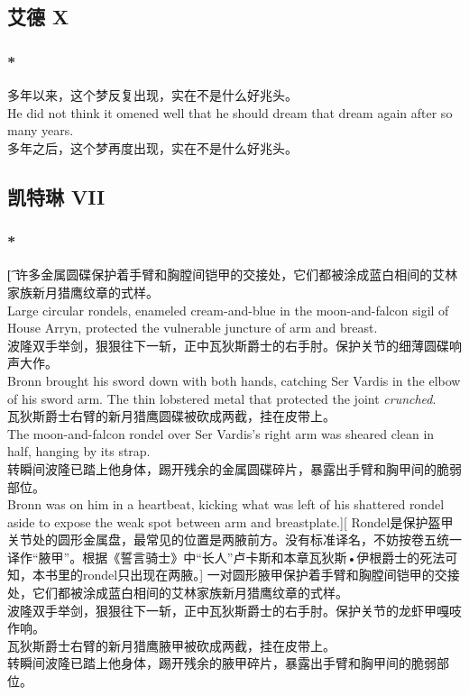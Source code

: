 \documentclass[12pt,a4paper]{article}
\newcommand{\la}[1]{{\color{blue}#1}\\}
\begin{document}
\subsection{艾德 X}
\subsubsection{\color{red}*}\la{
	多年以来，这个梦反复出现，实在不是什么好兆头。\\
	He did not think it omened well that he should dream that dream again after so many years.}
	多年之后，这个梦再度出现，实在不是什么好兆头。
	
\subsection{凯特琳 VII}

\subsubsection{\color{red}*}\label{1.40.1}\t[
	许多金属圆碟保护着手臂和胸膛间铠甲的交接处，它们都被涂成蓝白相间的艾林家族新月猎鹰纹章的式样。\\
	Large circular rondels, enameled cream-and-blue in the moon-and-falcon sigil of House Arryn, protected the vulnerable juncture of arm and breast.\\
	波隆双手举剑，狠狠往下一斩，正中瓦狄斯爵士的右手肘。保护关节的细薄圆碟响声大作。\\
	Bronn brought his sword down with both hands, catching Ser Vardis in the elbow of his sword arm. The thin lobstered metal that protected the joint \emph{crunched}.\\
	瓦狄斯爵士右臂的新月猎鹰圆碟被砍成两截，挂在皮带上。\\
	The moon-and-falcon rondel over Ser Vardis's right arm was sheared clean in half, hanging by its strap.\\
	转瞬间波隆已踏上他身体，踢开残余的金属圆碟碎片，暴露出手臂和胸甲间的脆弱部位。\\
	Bronn was on him in a heartbeat, kicking what was left of his shattered rondel aside to expose the weak spot between arm and breastplate.][
	Rondel是保护盔甲关节处的圆形金属盘，最常见的位置是两腋前方。没有标准译名，不妨按卷五统一译作“腋甲”。根据《誓言骑士》中“长人”卢卡斯和本章瓦狄斯•伊根爵士的死法可知，本书里的rondel只出现在两腋。]
	一对圆形腋甲保护着手臂和胸膛间铠甲的交接处，它们都被涂成蓝白相间的艾林家族新月猎鹰纹章的式样。\\
	波隆双手举剑，狠狠往下一斩，正中瓦狄斯爵士的右手肘。保护关节的龙虾甲嘎吱作响。\\
	瓦狄斯爵士右臂的新月猎鹰腋甲被砍成两截，挂在皮带上。\\
	转瞬间波隆已踏上他身体，踢开残余的腋甲碎片，暴露出手臂和胸甲间的脆弱部位。
	
\end{document}
